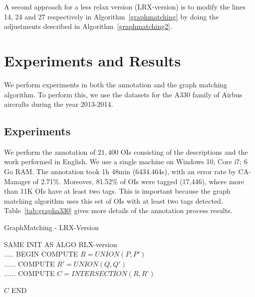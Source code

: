 \documentclass[runningheads,a4paper]{{llncs}}
\begin{document}
A second approach for a less relax version (LRX-version) is to modify the lines 14, 24 and 27 respectively in Algorithm~\ref{graphmatching} by doing the adjustments described in Algorithm~\ref{graphmatching2}.


 

\section{Experiments and Results}
\label{sec:exp-results}

We perform experiments in both the annotation and the graph matching algorithm. To perform this, we use the datasets for the A330 family of Airbus aircrafts during the year 2013-2014.  

\subsection{Experiments}
We perform the annotation of $21,400$ OIs consisting of the descriptions and the work performed in English. We use a single machine on Windows 10, Core i7; 6 Go RAM. The annotation took 1h 48min (6434.464s), with an error rate by CA-Manager of 2.71\%. Moreover, 81.52\% of OIs were tagged (17,446), where more than 11K OIs have at least two tags. This is important because the graph matching algorithm uses this set of OIs with at least two tags detected. Table~\ref{tab:grapha330} gives more details of the annotation process results.  


\begin{algorithm}[!htb]\scriptsize
 \caption{GraphMatching - LRX-Version}
 \label{graphmatching2}
\begin{algorithmic}[1]
\STATE SAME INIT AS ALGO RLX-version \\
.....
\STATE BEGIN
 \STATE COMPUTE $R = UNION(P,P')$ \\
 ......
 \STATE COMPUTE $R' = UNION(Q,Q')$ \\
 ......
 \STATE COMPUTE $C = INTERSECTION(R, R’)$

\RETURN $C$
  \STATE END
\end{algorithmic}
\end{algorithm}
\end{document}
